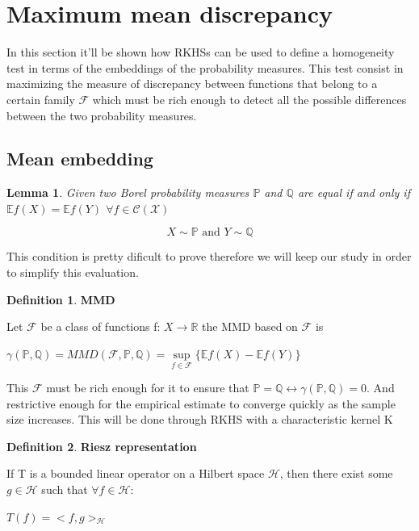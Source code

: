 \documentclass[8pt,a4paper]{article}
\theoremstyle{plain}
\newtheorem{lem}[thm]{Lemma}
\theoremstyle{definition}
\newtheorem{defn}{Definition}[section]
\theoremstyle{remark}
\begin{document}
\section{Maximum mean discrepancy}
In this section it'll be shown how RKHSs can be used to define a homogeneity test in terms of the embeddings of the probability measures.
This test consist in maximizing the measure of discrepancy between functions that belong to a certain family $\mathcal{F}$ which must be rich enough to detect all the possible differences between the two probability measures.
\subsection{Mean embedding}

\begin{lem}
Given two Borel probability measures $\mathbb{P}$ and $\mathbb{Q}$  are equal if and only if $\mathbb{E}f(X) = \mathbb{E}f(Y)$  $\forall f \in \mathcal{C(X)}$

$$X \sim \mathbb{P} \text{ and } Y \sim \mathbb{Q}$$
\end{lem}
\begin{flushleft}
This condition is pretty dificult to prove therefore we will keep our study in order to simplify this evaluation.
\end{flushleft}

\begin{defn}\textsf{\textbf{MMD}}

Let $\mathcal{F}$ be a class of functions f: $X \rightarrow \mathbb{R}$ the MMD based on $\mathcal{F}$ is

\end{defn}
\begin{center}
$\gamma(\mathbb{P},\mathbb{Q}) = MMD(\mathcal{F},\mathbb{P},\mathbb{Q}) =  \sup\limits_{f\in\mathcal{F}}\{\mathbb{E}f(X) -\mathbb{E}f(Y)\}$
\end{center}
\begin{flushleft}
This $\mathcal{F}$ must be rich enough for it to ensure that $\mathbb{P} = \mathbb{Q} \leftrightarrow \gamma(\mathbb{P},\mathbb{Q}) = 0$. And restrictive enough for the empirical estimate to converge quickly as the sample size increases.
This will be done through RKHS with a characteristic kernel K
\end{flushleft}
\begin{defn}
\textsf{\textbf{Riesz representation}}
\begin{flushleft}
If T is a bounded linear operator on a Hilbert space $\mathcal{H}$, then there exist some $g \in \mathcal{H}$ such that $\forall f \in \mathcal{H}$:
\end{flushleft}
\begin{center}
$T(f) = <f,g>_{\mathcal{H}}$
\end{center}
\end{defn}
\end{document}
